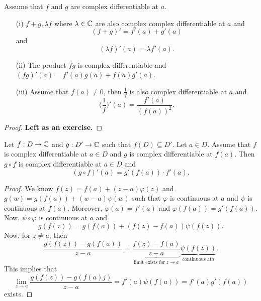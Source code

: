 \documentclass[a4paper]{report}
\begin{document}
\begin{theorem}
    Assume that \( f  \) and \( g  \) are complex differentiable at \( a \).
    \begin{enumerate}
        \item[(i)] \( f + g , \lambda f  \) where \( \lambda \in \mathbb{C}  \) are also complex complex differentiable at \( a  \) and 
            \[  (f+g)' = f'(a) + g'(a)  \]
            and
            \[  (\lambda f)' (a) = \lambda f'(a). \]
        \item[(ii)] The product \( fg  \) is complex differentiable and \( (fg)'(a) = f'(a) g(a) + f(a) g'(a) \).
        \item[(iii)] Assume that \( f(a) \neq 0  \), then \( \frac{ 1 }{ f }   \) is also complex differentiable at \( a  \) and 
            \[  \Big(  \frac{ 1 }{ f }  \Big)'(a) = \frac{ f'(a) }{ (f(a))^{2} }.  \]
    \end{enumerate}
\end{theorem}
\begin{proof}
\textbf{Left as an exercise.}
\end{proof}

\begin{theorem}
    Let \( f: D \to \mathbb{C}  \) and \( g: D' \to \mathbb{C}  \) such that \( f(D) \subseteq D'  \). Let \( a \in D  \). Assume that \( f \) is complex differentiable at \( a \in D  \) and \( g  \) is complex differentiable at \( f(a) \). Then \( g \circ f  \) is complex differentiable at \( a \in D  \) and 
    \[  (g \circ f)'(a) = g'(f(a)) \cdot f'(a). \]
\end{theorem}
\begin{proof}
We know \( f(z) = f(a) + (z-a) \varphi(z) \) and \( g(w) = g(f(a)) + (w-a) \psi (w) \) such that \( \varphi  \) is continuous at \( a  \) and \( \psi  \) is continuous at \( f(a) \). Moreover, \( \varphi(a) = f'(a) \) and \( \varphi(f(a))  = g'(f(a))\). Now, \( \psi \circ \varphi  \) is continuous at \( a  \) and 
\[  g(f(z))  = g(f(a)) + (f(z) - f(a)) \psi (f(z)). \]
Now, for \( z \neq a  \), then
\[  \frac{ g(f(z)) - g(f(a)) }{ z - a }  =  \underbrace{\frac{ f(z) - f(a) }{ z - a } }_{\text{limit exists for} \ z \to a}  \underbrace{\psi (f(z))}_{\text{continuous at} a}. \]
This implies that 
\[  \lim_{ z \to a }  \frac{ g(f(z)) - g(f(a)j) }{ z - a  } = f'(a) \psi (f(a)) = f'(a) g'(f(a))   \] exists.
\end{proof}
\end{document}
